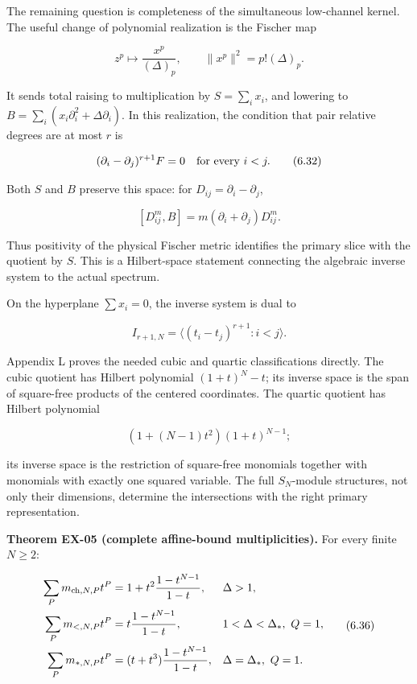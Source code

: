 \documentclass[a4paper,11pt]{article}
\numberwithin{equation}{section}
\begin{document}
The remaining question is completeness of the simultaneous low-channel kernel. The useful change of polynomial realization is the Fischer map

\[
z^p\longmapsto\frac{x^p}{(\Delta)_p},\qquad
\|x^p\|^2=p!(\Delta)_p.
\tag{6.31}
\]

It sends total raising to multiplication by \(S=\sum_i x_i\), and lowering to \(B=\sum_i(x_i\partial_i^2+\Delta\partial_i)\). In this realization, the condition that pair relative degrees are at most \(r\) is

\[
(\partial_i-\partial_j)^{r+1}F=0\quad\hbox{for every }i<j.
\tag{6.32}
\]

Both \(S\) and \(B\) preserve this space: for \(D_{ij}=\partial_i-\partial_j\),

\[
[D_{ij}^m,B]=m(\partial_i+\partial_j)D_{ij}^m.
\tag{6.33}
\]

Thus positivity of the physical Fischer metric identifies the primary slice with the quotient by \(S\). This is a Hilbert-space statement connecting the algebraic inverse system to the actual spectrum.

On the hyperplane \(\sum x_i=0\), the inverse system is dual to

\[
I_{r+1,N}=\langle(t_i-t_j)^{r+1}:i<j\rangle.
\tag{6.34}
\]

Appendix L proves the needed cubic and quartic classifications directly. The cubic quotient has Hilbert polynomial \((1+t)^N-t\); its inverse space is the span of square-free products of the centered coordinates. The quartic quotient has Hilbert polynomial

\[
(1+(N-1)t^2)(1+t)^{N-1};
\tag{6.35}
\]

its inverse space is the restriction of square-free monomials together with monomials with exactly one squared variable. The full \(S_N\)-module structures, not only their dimensions, determine the intersections with the right primary representation.

\textbf{Theorem EX-05 (complete affine-bound multiplicities).} For every finite \(N\ge2\):

\[
\begin{aligned}
\sum_Pm_{{\rm ch},N,P}t^P&=1+t^2\frac{1-t^{N-1}}{1-t},&&\Delta>1,\\
\sum_Pm_{<,N,P}t^P&=t\frac{1-t^{N-1}}{1-t},&&1<\Delta<\Delta_*,\ Q=1,\\
\sum_Pm_{*,N,P}t^P&=(t+t^3)\frac{1-t^{N-1}}{1-t},&&\Delta=\Delta_*,\ Q=1.
\end{aligned}
\tag{6.36}
\]
\end{document}
